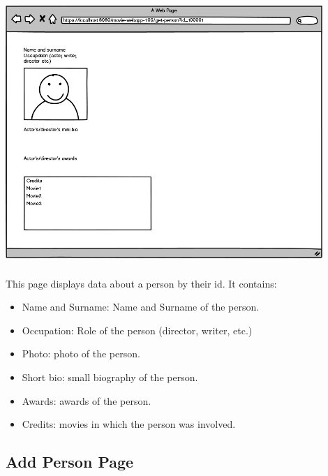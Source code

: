 \begin{center}
\includegraphics[width=12cm, height=10cm]{pictures/Person_prototype.png}
\end{center}

This page displays data about a person by their id. It contains:
\begin{itemize}
\item Name and Surname: Name and Surname of the person.
\item  Occupation: Role of the person (director, writer, etc.)
\item  Photo: photo of the person.
\item  Short bio: small biography of the person.
\item  Awards: awards of the person.
\item  Credits: movies in which the person was involved.
\end{itemize}

\subsection{Add Person Page}


